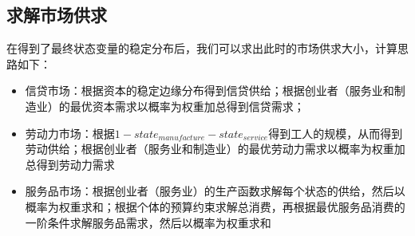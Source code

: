 \documentclass[a4paper, 12pt]{ctexart}
\begin{document}
\subsection{求解市场供求}
在得到了最终状态变量的稳定分布后，我们可以求出此时的市场供求大小，计算思路如下：
\begin{itemize}
    \item 信贷市场：根据资本的稳定边缘分布得到信贷供给；根据创业者（服务业和制造业）的最优资本需求以概率为权重加总得到信贷需求；
    \item 劳动力市场：根据$1-state_{manufacture}-state_{service}$得到工人的规模，从而得到劳动供给；根据创业者（服务业和制造业）的最优劳动力需求以概率为权重加总得到劳动力需求
    \item 服务品市场：根据创业者（服务业）的生产函数求解每个状态的供给，然后以概率为权重求和；根据个体的预算约束求解总消费，再根据最优服务品消费的一阶条件求解服务品需求，然后以概率为权重求和
\end{itemize}
\end{document}
